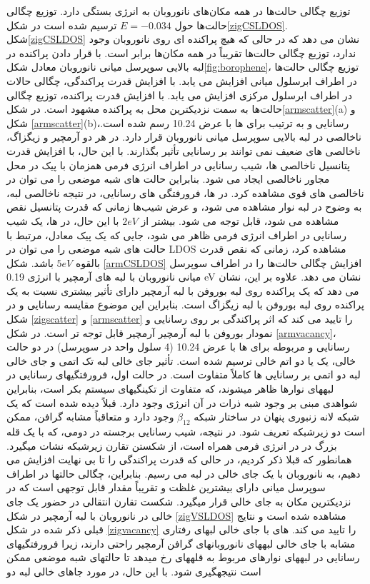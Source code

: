 توزیع چگالی حالت‌ها در همه مکان‌های نانوروبان به انرژی بستگی دارد. توزیع چگالی حالت‌ها حول $E=-0.034$ ترسیم شده است در شکل\ref{zigCSLDOS}. شکل\ref{zigCSLDOS} نشان می دهد که در حالی که هیچ پراکنده ای روی نانوروبان وجود ندارد، توزیع چگالی حالت‌ها تقریباً در همه مکان‌ها برابر است. با قرار دادن پراکنده در لبه بالایی سوپرسل میانی نانوروبان معادل شکل\ref{fig:borophene}، توزیع چگالی حالت‌ها در اطراف ابرسلول میانی افزایش می یابد. با افزایش قدرت پراکندگی، چگالی حالات در اطراف ابرسلول مرکزی افزایش می یابد. با افزایش قدرت پراکنده، توزیع چگالی حالت‌ها به سمت نزدیکترین محل به پراکنده مشهود است. در شکل\ref{armscatter}(a) و شکل \ref{armscatter}(b)،رسانایی و  به ترتیب برای ها با عرض \lr{\AA} 10.24 رسم شده است. ناخالصی در لبه بالایی سوپرسل میانی نانوروبان قرار دارد. در هر دو  آرمچیر و زیگزاگ، ناخالصی های ضعیف نمی توانند بر رسانایی تأثیر بگذارند. با این حال، با افزایش قدرت پتانسیل ناخالصی ها، شیب رسانایی در اطراف انرژی فرمی همزمان با پیک  در محل مجاور ناخالصی ایجاد می شود. بنابراین حالت های شبه موضعی را می توان در ناخالصی های قوی مشاهده کرد. در  ها، فرورفتگی های رسانایی، در نتیجه ناخالصی لبه، به وضوح در لبه نوار مشاهده می شود، و عرض شیب‌ها زمانی که قدرت پتانسیل نقص مشاهده می شود، قابل توجه می شود. بیشتر از $2 eV$ با این حال، در  ها، یک شیب رسانایی در اطراف انرژی فرمی ظاهر می شود، جایی که یک پیک معادل، مرتبط با حالت های شبه موضعی را می توان در LDOS مشاهده کرد، زمانی که نقص قدرت بالقوه $5 eV$ باشد. شکل \ref{armCSLDOS} افزایش چگالی حالت‌ها را در اطراف سوپرسل میانی نانوروبان با لبه های آرمچیر با انرژی 0.19 eV نشان می دهد. علاوه بر این، نشان می دهد که یک پراکنده روی لبه بوروفن با لبه آرمچیر دارای تأثیر بیشتری نسبت به یک پراکنده روی لبه بوروفن با لبه زیگزاگ است. بنابراین این موضوع مقایسه رسانایی و  در شکل \ref{zigscatter} و \ref{armscatter} را تایید می کند که اثر پراکندگی بر روی رسانایی و نمودار  بوروفن با لبه آرمچیر آرمچیر قابل توجه تر است. در شکل \ref{armvacancy}، رسانایی و  مربوطه برای ها با عرض \lr{\AA} 10.24 (4 سلول واحد در سوپرسل) در دو حالت خالی، یک یا دو اتم خالی ترسیم شده است. تأثیر جای خالی لبه تک اتمی و جای خالی لبه دو اتمی بر رسانایی  ها کاملاً متفاوت است. در حالت اول، فرورفتگیهای رسانایی در لبههای نوارها ظاهر میشوند، که متفاوت از تکینگیهای  سیستم بکر است، بنابراین شواهدی مبنی بر وجود شبه ذرات در آن انرژی وجود دارد. قبلاً دیده شده است که یک شبکه لانه زنبوری پنهان در ساختار شبکه $\beta_{12}$ وجود دارد و متعاقباً مشابه گرافن، ممکن است دو زیرشبکه تعریف شود. در نتیجه، شیب رسانایی برجسته در دومی، که با یک قله بزرگ در  در انرژی فرمی همراه است، از شکستن تقارن زیرشبکه نشات میگیرد. همانطور که قبلا ذکر کردیم، در حالی که قدرت پراکندگی را تا بی نهایت افزایش می دهیم، به نانوروبان با یک جای خالی در لبه می رسیم. بنابراین، چگالی حالتها در اطراف سوپرسل میانی دارای بیشترین غلظت و تقریباً مقدار قابل توجهی  است که در نزدیکترین مکان به جای خالی قرار میگیرد. شکست تقارن انتقالی در حضور یک جای خالی در نانوروبان با لبه آرمچیر در شکل \ref{zigVSLDOS} مشاهده شده است و نتایج قبلی ذکر شده در شکل \ref{zigvacancy} را تایید می کند. های با جای خالی لبهای رفتاری مشابه با جای خالی لبههای نانوروبانهای گرافن آرمچیر راحتی دارند، زیرا فرورفتگیهای رسانایی در لبههای نوارهای مربوط به قلههای  رخ میدهد تا حالتهای شبه موضعی ممکن است نتیجهگیری شود. با این حال، در مورد جاهای خالی لبه دو 